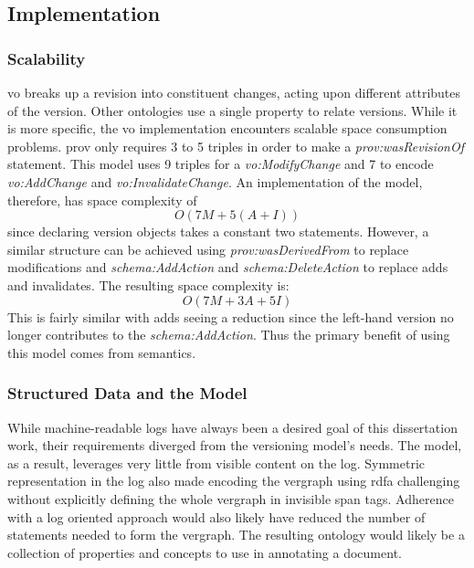 \subsection{Implementation}

\subsubsection{Scalability}

\gls{vo} breaks up a revision into constituent changes, acting upon different \glspl{attribute} of the \gls{version}.
Other ontologies use a single property to relate \glspl{version}.
While it is more specific, the \gls{vo} implementation encounters scalable space consumption problems.
\gls{prov} only requires 3 to 5 triples in order to make a \textit{prov:wasRevisionOf} statement.
This model uses 9 triples for a \textit{vo:ModifyChange} and 7 to encode \textit{vo:AddChange} and \textit{vo:InvalidateChange}.
An implementation of the model, therefore, has space complexity of \[O(7M+5(A+I))\] since declaring \gls{version} objects takes a constant two statements.
However, a similar structure can be achieved using \textit{prov:wasDerivedFrom} to replace modifications and \textit{schema:AddAction} and \textit{schema:DeleteAction} to replace \glspl{add} and \glspl{invalidate}.
The resulting space complexity is: \[O(7M+3A+5I)\]
This is fairly similar with \glspl{add} seeing a reduction since the left-hand \gls{version} no longer contributes to the \textit{schema:AddAction}.
Thus the primary benefit of using this model comes from semantics.

\subsubsection{Structured Data and the Model}

While machine-readable \glspl{log} have always been a desired goal of this dissertation work, their requirements diverged from the versioning model's needs.
The model, as a result, leverages very little from visible content on the \gls{log}.
Symmetric representation in the \gls{log} also made encoding the \gls{vergraph} using \gls{rdfa} challenging without explicitly defining the whole \gls{vergraph} in invisible span tags.
Adherence with a \gls{log} oriented approach would also likely have reduced the number of statements needed to form the \gls{vergraph}.
The resulting ontology would likely be a collection of properties and concepts to use in annotating a document.

